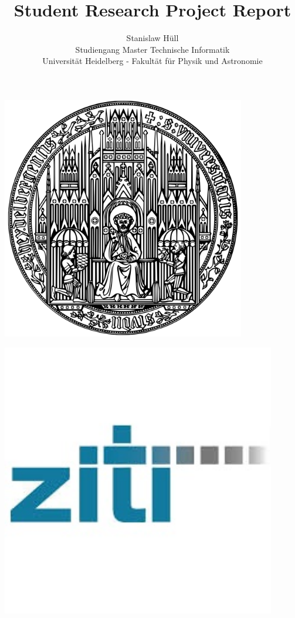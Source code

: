 \documentclass{report}
\author{\Large{Stanislaw Hüll}\\{Studiengang Master Technische Informatik}\\{Universität Heidelberg - Fakultät für
Physik und Astronomie}} \title{Student Research Project Report} \date{}
\begin{document}
\begin{minipage}[h]{\textwidth} \maketitle \vspace{0.5cm} \begin{minipage}[h]{\textwidth} \centering
  \begin{minipage}{0.3\textwidth} \centering \includegraphics[width=0.8\textwidth]{unihd} \end{minipage}
    \begin{minipage}{0.4\textwidth} \centering \includegraphics[width=0.9\textwidth]{zitihd} \end{minipage}

\end{minipage}
\end{minipage}
\end{document}
